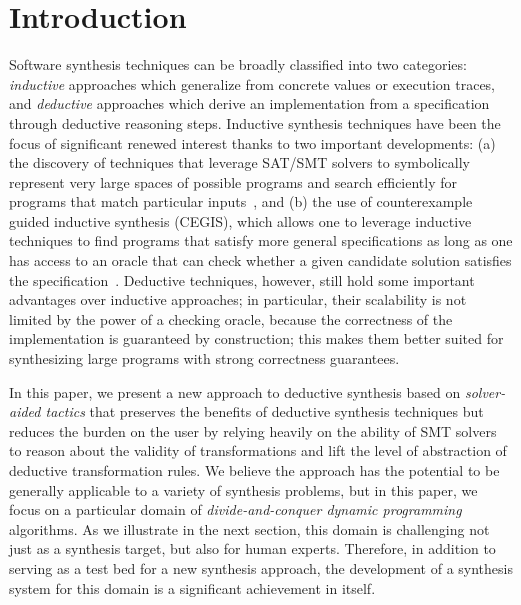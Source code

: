 \section{Introduction}
\label{intro}


\newcommand{\xidx}{i}
\newcommand{\yidx}{j}
\newcommand{\xw}[1]{w_{#1}}
\newcommand{\yw}[1]{w'_{#1}}



Software synthesis techniques can be broadly classified into two categories: \emph{inductive} approaches which generalize from concrete values or execution traces, and \emph{deductive} approaches which derive an implementation from a specification through deductive reasoning steps. Inductive synthesis techniques have been the focus of significant renewed interest thanks to two important developments: (a) the discovery of techniques that leverage SAT/SMT solvers to symbolically represent very large spaces of possible programs and search efficiently for programs that match particular inputs~\cite{sketch, brahma, rosette}, and (b) the use of counterexample guided inductive synthesis (CEGIS), which allows one to leverage inductive techniques to find programs that satisfy more general specifications as long as one has access to an oracle that can check whether a given candidate solution satisfies the specification~\cite{sketch}. Deductive techniques, however, still hold some important advantages over inductive approaches; in particular, their scalability is not limited by the power of a checking oracle, because the correctness of the implementation is guaranteed by construction; this makes them better suited for synthesizing large programs with strong correctness guarantees. 

In this paper, we present a new approach to deductive synthesis based on \emph{solver-aided tactics} that preserves the benefits of deductive synthesis techniques but reduces the burden on the user by relying heavily on the ability of SMT solvers to reason about the validity of transformations and lift the level of abstraction of deductive transformation rules. We believe the approach has the potential to be generally applicable to a variety of synthesis problems, but in this paper, we focus on a particular domain of \emph{divide-and-conquer dynamic programming} algorithms. As we illustrate in the next section, this domain is challenging not just as a synthesis target, but also for human experts. Therefore, in addition to serving as a test bed for a new synthesis approach, the development of a synthesis system for this domain is a significant achievement in itself.

